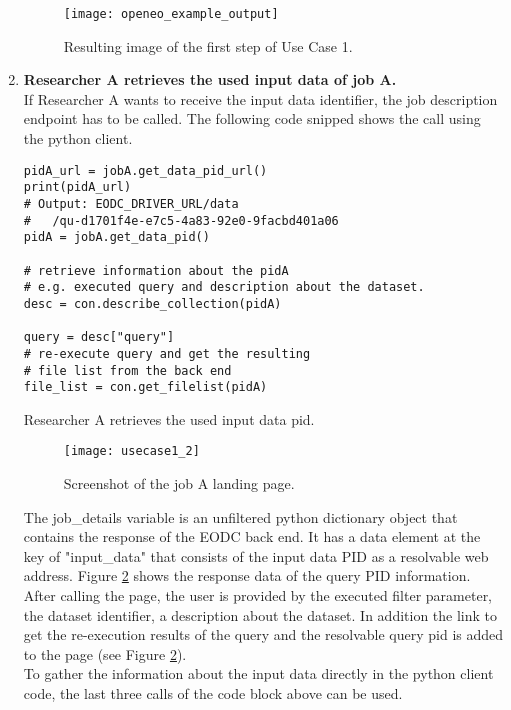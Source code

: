 \documentclass[draft,final]{vutinfth} %
\newenvironment{code}{\captionsetup{type=listing}}{}
\begin{document}
\begin{enumerate}
\begin{figure}[h]
	\centering
	\texttt{[image: openeo\_example\_output]}
	\caption{Resulting image of the first step of Use Case 1.}
	\label{fig:impl_usecase1_min} %
\end{figure}

	\item \textbf{Researcher A retrieves the used input data of job A.} \\
	If Researcher A wants to receive the input data identifier, the job description endpoint has to be called. The following code snipped shows the call using the python client.

\begin{code}
	\begin{verbatim}
pidA_url = jobA.get_data_pid_url()
print(pidA_url)
# Output: EODC_DRIVER_URL/data
#	/qu-d1701f4e-e7c5-4a83-92e0-9facbd401a06
pidA = jobA.get_data_pid()

# retrieve information about the pidA 
# e.g. executed query and description about the dataset.
desc = con.describe_collection(pidA)

query = desc["query"]
# re-execute query and get the resulting 
# file list from the back end
file_list = con.get_filelist(pidA)
	\end{verbatim}
	\caption{Researcher A retrieves the used input data pid.}
	\label{lst:impl_usecase1_2}
\end{code}
	
	\begin{figure}[h]
		\centering
		\texttt{[image: usecase1\_2]}
		\caption{Screenshot of the job A landing page.}
		\label{fig:usecase1-pid} %
	\end{figure}
	
	The job\_details variable is an unfiltered python dictionary object that contains the response of the EODC back end. It has a data element at the key of "input\_data" that consists of the input data PID as a resolvable web address. Figure \ref{fig:usecase1-pid} shows the response data of the query PID information. After calling the page, the user is provided by the executed filter parameter, the dataset identifier, a description about the dataset. In addition the link to get the re-execution results of the query and the resolvable query pid is added to the page (see Figure \ref{fig:usecase1-pid}). \\
	To gather the information about the input data directly in the python client code, the last three calls of the code block above can be used.  
	

\end{enumerate}
\end{document}
